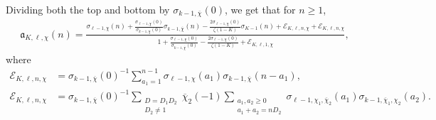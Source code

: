 \documentclass[11pt,letterpaper,reqno]{amsart}
\numberwithin{figure}{section}
\numberwithin{table}{section}
\theoremstyle{definition}
\theoremstyle{plain}
\theoremstyle{definition}
\theoremstyle{definition}
\theoremstyle{remark}
\numberwithin{equation}{section}
\theoremstyle{remark}
\begin{document}
Dividing  both the top and bottom by $\sigma_{k-1,\overline{\chi}}(0)$, we get that for $n\geq1$, 
\begin{align}
    \mathfrak{a}_{K,\ell,\chi}(n)=\frac{\sigma_{\ell-1,\chi}(n)+\frac{\sigma_{\ell-1,\chi}(0)}{\sigma_{k-1,\overline{\chi}}(0)}\sigma_{k-1,\overline{\chi}}(n)-\frac{2\sigma_{\ell-1,\chi}(0)}{\zeta(1-K) }\sigma_{K-1}(n)+\mathcal{E}_{K,\ell,n,\chi}+\mathscr{E}_{K,\ell,n,\chi}}{1+\frac{\sigma_{\ell-1,\chi}(0)}{\sigma_{k-1,\overline{\chi}}(0)}-\frac{2\sigma_{\ell-1,\chi}(0)}{\zeta(1-K) }+\mathscr{E}_{K,\ell,1,\chi}}, \label{eq:expressionoftheFoco}
\end{align}
where 
\begin{align*}
\mathcal{E}_{K,\ell,n,\chi}&=\sigma_{k-1,\overline{\chi}}(0)^{-1}\sum_{a_1=1}^{n-1}\sigma_{\ell-1,\chi}(a_1)\sigma_{k-1,\overline{\chi}}(n-a_1), \\
\mathscr{E}_{K,\ell,n,\chi}&=\sigma_{k-1,\overline{\chi}}(0)^{-1}\sum\limits_{\substack{D=D_1D_2\\D_2\neq 1}}\overline{\chi}_2(-1)\sum\limits_{\substack{a_1,a_2\geq0\\a_1+a_2=nD_2}}\sigma_{\ell-1,\chi_1,\overline{\chi}_{2}}(a_1)\sigma_{k-1,\overline{\chi}_{1},\chi_2}(a_2).
\end{align*}
\end{document}
